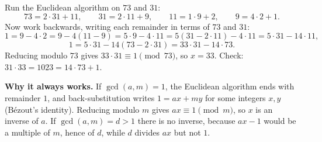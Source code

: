 Run the Euclidean algorithm on $73$ and $31$:
\[73=2\cdot31+11,\qquad 31=2\cdot11+9,\qquad 11=1\cdot9+2,\qquad 9=4\cdot2+1 .\]
Now work backwards, writing each remainder in terms of $73$ and $31$:
\[1=9-4\cdot2=9-4(11-9)=5\cdot9-4\cdot11=5(31-2\cdot11)-4\cdot11=5\cdot31-14\cdot11,\]
\[1=5\cdot31-14(73-2\cdot31)=33\cdot31-14\cdot73 .\]
Reducing modulo $73$ gives $33\cdot31\equiv1\pmod{73}$, so $x=\boxed{33}$. Check: $31\cdot33=1023=14\cdot73+1$.

\textbf{Why it always works.} If $\gcd(a,m)=1$, the Euclidean algorithm ends with remainder $1$, and back-substitution writes $1=ax+my$ for some integers $x,y$ (B\'ezout's identity). Reducing modulo $m$ gives $ax\equiv1\pmod m$, so $x$ is an inverse of $a$. If $\gcd(a,m)=d>1$ there is no inverse, because $ax-1$ would be a multiple of $m$, hence of $d$, while $d$ divides $ax$ but not $1$.

